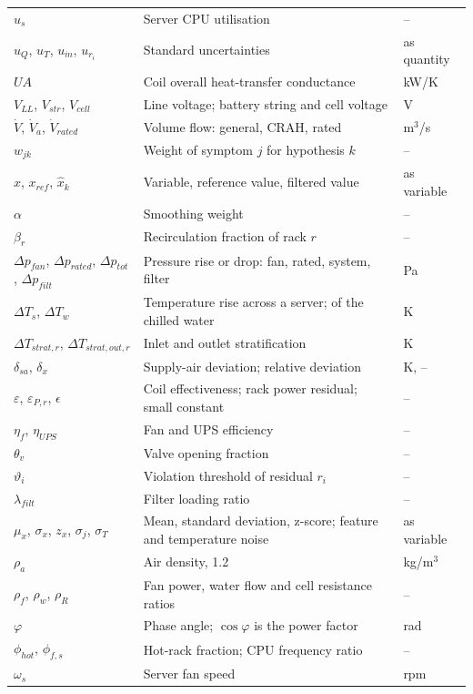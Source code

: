 \begin{small}
\begin{longtable}{L{3.6cm}L{8.6cm}L{1.8cm}}
  $u_s$ & Server CPU utilisation & -- \\
  $u_Q$, $u_T$, $u_{\dot m}$, $u_{r_i}$ & Standard uncertainties & as quantity \\
  $UA$ & Coil overall heat-transfer conductance & kW/K \\
  $V_{LL}$, $V_{str}$, $V_{cell}$ & Line voltage; battery string and cell voltage & V \\
  $\dot V$, $\dot V_a$, $\dot V_{rated}$ & Volume flow: general, CRAH, rated & m$^3$/s \\
  $w_{jk}$ & Weight of symptom $j$ for hypothesis $k$ & -- \\
  $x$, $x_{ref}$, $\hat x_k$ & Variable, reference value, filtered value & as variable \\
  $\alpha$ & Smoothing weight & -- \\
  $\beta_r$ & Recirculation fraction of rack $r$ & -- \\
  $\Delta p_{fan}$, $\Delta p_{rated}$, $\Delta p_{tot}$, $\Delta p_{filt}$ & Pressure rise or drop: fan, rated, system, filter & Pa \\
  $\Delta T_s$, $\Delta T_w$ & Temperature rise across a server; of the chilled water & K \\
  $\Delta T_{strat,r}$, $\Delta T_{strat,out,r}$ & Inlet and outlet stratification & K \\
  $\delta_{sa}$, $\delta_x$ & Supply-air deviation; relative deviation & K, -- \\
  $\varepsilon$, $\varepsilon_{P,r}$, $\epsilon$ & Coil effectiveness; rack power residual; small constant & -- \\
  $\eta_f$, $\eta_{UPS}$ & Fan and UPS efficiency & -- \\
  $\theta_v$ & Valve opening fraction & -- \\
  $\vartheta_i$ & Violation threshold of residual $r_i$ & -- \\
  $\lambda_{filt}$ & Filter loading ratio & -- \\
  $\mu_x$, $\sigma_x$, $z_x$, $\sigma_j$, $\sigma_T$ & Mean, standard deviation, z-score; feature and temperature noise & as variable \\
  $\rho_a$ & Air density, 1.2 & kg/m$^3$ \\
  $\rho_f$, $\rho_w$, $\rho_R$ & Fan power, water flow and cell resistance ratios & -- \\
  $\varphi$ & Phase angle; $\cos\varphi$ is the power factor & rad \\
  $\phi_{hot}$, $\phi_{f,s}$ & Hot-rack fraction; CPU frequency ratio & -- \\
  $\omega_s$ & Server fan speed & rpm \\
  \bottomrule
\end{longtable}
\end{small}

